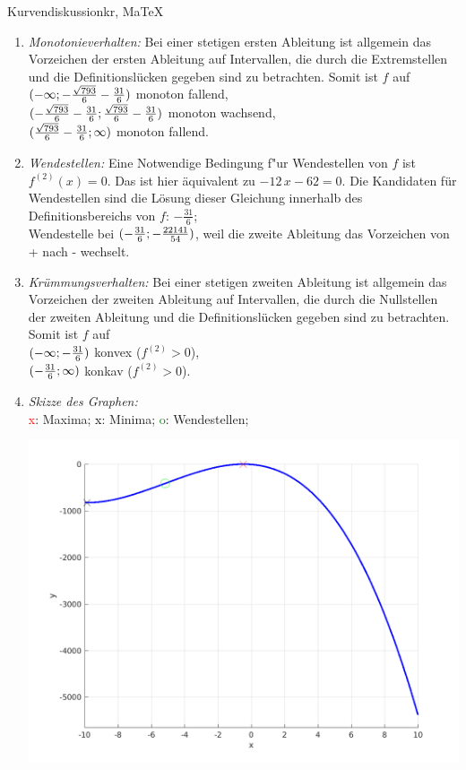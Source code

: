 \begin{MAufgabe}{Kurvendiskussion}{kr, MaTeX}
\begin{enumerate}
 \item \emph{Monotonieverhalten:} 
 Bei einer stetigen ersten Ableitung ist allgemein das Vorzeichen der ersten Ableitung auf Intervallen, die durch die Extremstellen und die Definitionsl\"ucken gegeben sind zu betrachten. Somit ist $f$ auf \\ 
 $(-\infty; - \frac{\sqrt{793}}{6} - \frac{31}{6})$ monoton fallend, \\ 
 $( - \frac{\sqrt{793}}{6} - \frac{31}{6};\frac{\sqrt{793}}{6} - \frac{31}{6})$ monoton  wachsend, \\ 
 $(\frac{\sqrt{793}}{6} - \frac{31}{6}; \infty)$ monoton fallend. \\ 
 \item \emph{Wendestellen:} 
 Eine Notwendige Bedingung f"ur Wendestellen von $f$ ist $f^{(2)}(x)=0$. 
 Das ist hier \"aquivalent zu $ - 12\, x - 62=0$. 
 Die Kandidaten f\"ur Wendestellen sind die L\"osung dieser Gleichung innerhalb des Definitionsbereichs von $f$: $- \frac{31}{6}$; \\ 
 Wendestelle bei $(- \frac{31}{6};- \frac{22141}{54})$, weil die zweite Ableitung das Vorzeichen von + nach - wechselt. \\ 
 \item \emph{Kr\"ummungsverhalten:} 
 Bei einer stetigen zweiten Ableitung ist allgemein das Vorzeichen der zweiten Ableitung auf Intervallen, die durch die Nullstellen der zweiten Ableitung und die Definitionsl\"ucken gegeben sind zu betrachten. 
 Somit ist $f$ auf \\ 
 $(-\infty ;- \frac{31}{6})$  konvex ($f^{(2)}>0$), \\ 
 $(- \frac{31}{6}; \infty)$  konkav ($f^{(2)}>0$). \\ 
 \item \emph{Skizze des Graphen:} \\ 
 {\textcolor{red} x}: Maxima; {\textcolor{black} x}: Minima; {\textcolor{green} o}: Wendestellen; 
  \begin{center}
  \includegraphics[width=0.8\linewidth]{Abb_zur_Ag_autogenerated_fractions_33.png} \end{center}
  
 \end{enumerate}
 \else\relax\fi
  \end{MAufgabe}